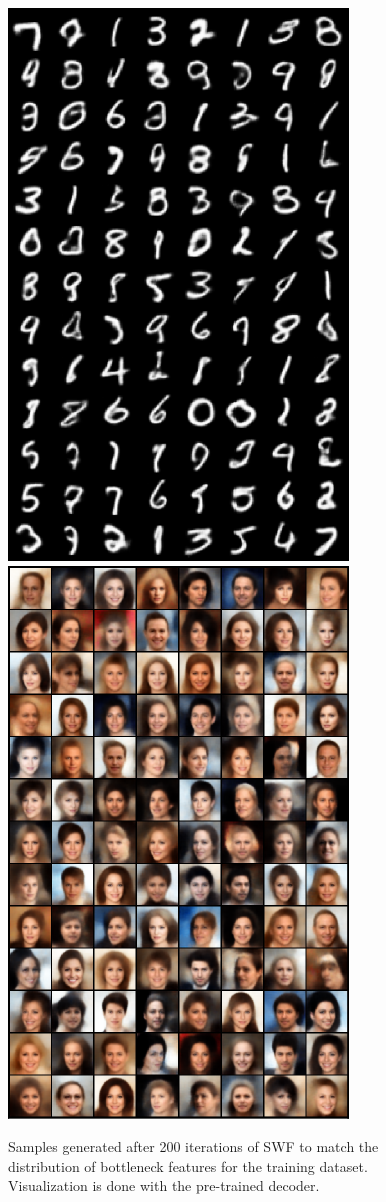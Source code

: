 \begin{figure}[h]
\centering
\includegraphics[width=0.49\columnwidth]{figures/MNIST_train_image_500.pdf}
\includegraphics[width=0.49\columnwidth]{figures/CelebA_train_image_500.pdf}
\label{fig:samples}\vspace{-2\baselineskip}
\caption{Samples generated after 200 iterations of SWF to match the distribution of bottleneck features for the training dataset. Visualization is done with the pre-trained decoder.}
\vspace{-\baselineskip}
\end{figure}

